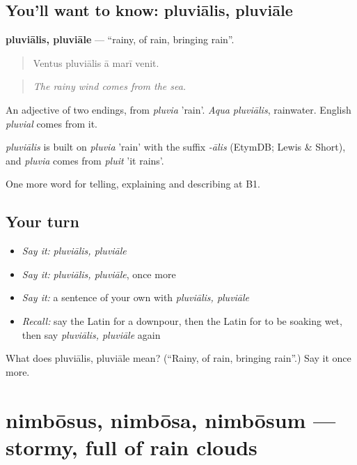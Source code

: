 \subsection*{You'll want to know: pluviālis, pluviāle}
\textbf{pluviālis, pluviāle} — \textquotedblleft{}rainy, of rain, bringing rain\textquotedblright{}.

\begin{quote}
Ventus pluviālis ā marī venit.
\end{quote}

\begin{quote}
\emph{The rainy wind comes from the sea.}
\end{quote}

An adjective of two endings, from \emph{pluvia} 'rain'. \emph{Aqua pluviālis}, rainwater. English \emph{pluvial} comes from it.

\begin{cousinweb}
\emph{pluviālis} is built on \emph{pluvia} 'rain' with the suffix \emph{-ālis} (EtymDB; Lewis \& Short), and \emph{pluvia} comes from \emph{pluit} 'it rains'.
\end{cousinweb}

\begin{grammarlens}[title={What you've built}]
One more word for telling, explaining and describing at B1.
\end{grammarlens}

\subsection*{Your turn}
\begin{itemize}
\raggedright
  \item \emph{Say it:} \emph{pluviālis, pluviāle}
  \item \emph{Say it:} \emph{pluviālis, pluviāle}, once more
  \item \emph{Say it:} a sentence of your own with \emph{pluviālis, pluviāle}
  \item \emph{Recall:} say the Latin for a downpour, then the Latin for to be soaking wet, then say \emph{pluviālis, pluviāle} again
\end{itemize}

\begin{tcolorbox}[breakable,colback=teal!4,colframe=teal!35!black,title={Before you move on}]
What does pluviālis, pluviāle mean? (\textquotedblleft{}Rainy, of rain, bringing rain\textquotedblright{}.) Say it once more.
\end{tcolorbox}
\section[nimbōsus, nimbōsa, nimbōsum]{nimbōsus, nimbōsa, nimbōsum — stormy, full of rain clouds}

